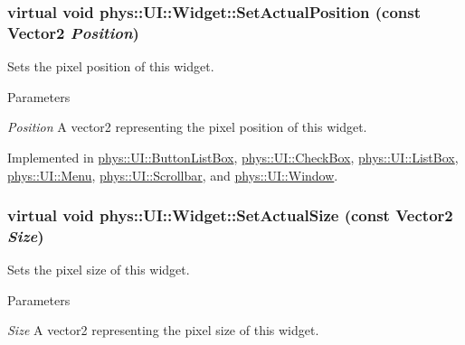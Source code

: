 \hypertarget{classphys_1_1UI_1_1Widget_acba334c000c21f477238e961cd3ab2ce}{
\subsubsection[{SetActualPosition}]{\setlength{\rightskip}{0pt plus 5cm}virtual void phys::UI::Widget::SetActualPosition (const {\bf Vector2} {\em Position})}}
\label{d9/d48/classphys_1_1UI_1_1Widget_acba334c000c21f477238e961cd3ab2ce}


Sets the pixel position of this widget. 


\begin{DoxyParams}{Parameters}
\item[{\em Position}]A vector2 representing the pixel position of this widget. \end{DoxyParams}


Implemented in \hyperlink{classphys_1_1UI_1_1ButtonListBox_af2b466c6268cc469fadae7664fa3ff02}{phys::UI::ButtonListBox}, \hyperlink{classphys_1_1UI_1_1CheckBox_aef3136db1a0f503f3a20955faf2166db}{phys::UI::CheckBox}, \hyperlink{classphys_1_1UI_1_1ListBox_afa7daa798bf8702bcc3e7c4cd9dcfdf4}{phys::UI::ListBox}, \hyperlink{classphys_1_1UI_1_1Menu_a18161cae59d7a8be52a2d77e27e0c5a1}{phys::UI::Menu}, \hyperlink{classphys_1_1UI_1_1Scrollbar_a6070857488f05d0349b48f249edf813f}{phys::UI::Scrollbar}, and \hyperlink{classphys_1_1UI_1_1Window_a2b8dfb4d8f2c730502ead6d1e8bb10e2}{phys::UI::Window}.

\hypertarget{classphys_1_1UI_1_1Widget_a8c942355474d0b250dfadd4dac4ae400}{
\subsubsection[{SetActualSize}]{\setlength{\rightskip}{0pt plus 5cm}virtual void phys::UI::Widget::SetActualSize (const {\bf Vector2} {\em Size})}}
\label{d9/d48/classphys_1_1UI_1_1Widget_a8c942355474d0b250dfadd4dac4ae400}


Sets the pixel size of this widget. 


\begin{DoxyParams}{Parameters}
\item[{\em Size}]A vector2 representing the pixel size of this widget. \end{DoxyParams}



